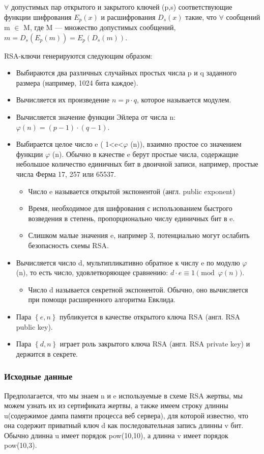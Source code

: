 \documentclass[20pt]{article}
\begin{document}
 $\forall$  допустимых пар открытого и закрытого ключей  (p,s)
  соответствующие функции шифрования $E_{p}(x)$ и расшифрования $D_{s}(x)$ такие, что
 $\forall$  сообщений  m $\in$ M, где  M — множество допустимых сообщений, $m=D_{s}(E_{p}(m))=E_{p}(D_{s}(m))$.

RSA-ключи генерируются следующим образом:
\begin{itemize}
  \item Выбираются два различных случайных простых числа  p и  q заданного размера (например, 1024 бита каждое).
  \item Вычисляется их произведение  $n=p\cdot q$, которое называется модулем.
  \item Вычисляется значение функции Эйлера от числа  n: $\varphi (n)=(p-1)\cdot (q-1)$.
  \item Выбирается целое число  e (  1<e<$\varphi$ (n)), взаимно простое со
  значением функции $\varphi$ (n). Обычно в качестве  e берут простые числа,
  содержащие небольшое количество единичных бит в двоичной записи, например,
  простые числа Ферма 17, 257 или 65537.
  \begin{itemize}
    \item Число e называется открытой экспонентой (англ. public exponent)
    \item Время, необходимое для шифрования с использованием быстрого возведения
    в степень, пропорционально числу единичных бит в e.
    \item Слишком малые значения e, например 3, потенциально могут ослабить
    безопасность схемы RSA.
  \end{itemize}
  \item Вычисляется число  d, мультипликативно обратное к числу  e по модулю
  $\varphi$ (n), то есть число, удовлетворяющее сравнению: $d\cdot e\equiv 1{\pmod {\varphi (n)}}$.
  \begin{itemize}
    \item Число  d называется секретной экспонентой. Обычно, оно вычисляется при помощи расширенного алгоритма Евклида.
  \end{itemize}
  \item Пара $\left\{e,n\right\}$ публикуется в качестве открытого ключа RSA (англ. RSA public key).
  \item Пара $\left\{d,n\right\}$ играет роль закрытого ключа RSA (англ. RSA private key) и держится в секрете.
\end{itemize}

\subsubsection{Исходные данные}
Предполагается, что мы знаем n и e используемые в схеме RSA жертвы, мы можем
узнать их из сертификата жертвы, а также имеем строку длинны u(содержимое дампа
памяти процесса веб сервера), для которой известно, что она содержит приватный
ключ d как последовательная запись длинны v бит. Обычно длинна u имеет порядок
pow(10,10), а длинна v имеет порядок pow(10,3).
\end{document}
